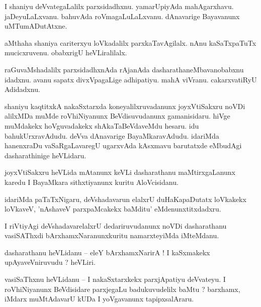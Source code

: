 \documentclass{article}
\begin{document}
\begin{mn}%
I shaniyu deVvategaLalilx parxsidadhxnu. yamarUpiyAda mahAgarxhavu. jaDeyuLaLxvanu. bahuvAda 
roVmagaLuLaLxvanu. dAnavarige Bayavanunx uMTumADutAtxne.
\end{mn}

\begin{mn}%
aMthaha shaniya cariterxyu loVkadalilx parxkaTavAgilalx. nAnu kaSaTxpaTuTx mucicxruvenu. obabxrigU 
heVLiralilalx.
\end{mn}

\begin{mn}%
raGuvaMshadalilx parxsidadhxnAda rAjanAda dasharathaneMbavanobabxnu idadxnu. avanu sapatx 
divxVpagaLige adhipatiyu. mahA viVranu. cakarxvatiRyU Adidadxnu.
\end{mn}

\begin{mn}%
shaniyu kaqtitxkA nakaSxtarxda koneyalilxruvadanunx joyxVtiSakxru noVDi alilxMDa muMde 
roVhiNiyanunx BeVdisuvudanunx gamanisidaru. hiVge muMdakekx hoVguvadakekx shAkaTaBeVdaveMdu 
hesaru. idu bahukUrxravAdudu. deVva dAnavarige BayaMkaravAdudu. idariMda hanenxraDu 
vaSaRgaLavaregU ugarxvAda kAsxmavu barutatxde eMbudAgi dasharathinige heVLidaru.
\end{mn}

\begin{mn}%
joyxVtiSakxru heVLida mAtanunx keVLi dasharathanu maMtirxgaLanunx karedu I BayaMkara sithxtiyanunx 
kuritu AloVcisidanu.
\end{mn}

\begin{mn}%
idariMda paTaTxNigaru, deVshadavarun elalxrU duHaKapaDutatx loVkakekx loVkaveV, 'nAshaveV 
parxpaMcakekx baMditu' eMdenunxtitxdadxru.
\end{mn}

\begin{mn}%
I riVtiyAgi deVshadavarelalxrU dedariruvudanunx noVDi dasharathanu vasiSAThxdi 
bArxhamxNaranunxkuritu namarxteyiMda iMteMdanu.
\end{mn}

\begin{mn}%
dasharathanu heVLidanu -- eleY bArxhamxNarirA ! I kaSxmakekx upAyaveVniruvudu ? heVLiri.
\end{mn}

\begin{mn}%
vasiSaThxnu heVLidanu -- I nakaSxtarxkekx parxjApatiyu deVvateyu. I roVhiNiyanunx BeVdisidare 
parxjegaLu badukuvudelilx baMtu ? barxhamx, iMdarx muMtAdavarU kUDa I yoVgavanunx tapipxsalAraru.
\end{mn}
\end{document}

